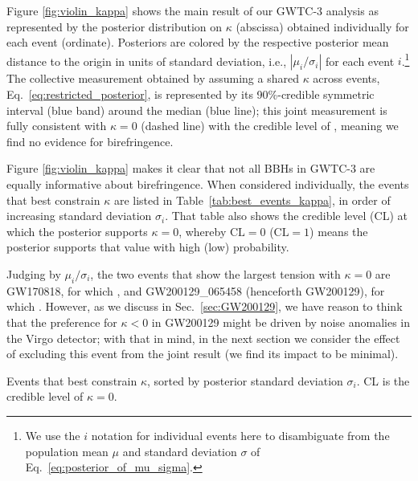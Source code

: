 \documentclass[aps,prd,twocolumn,superscriptaddress,preprintnumbers,nofootinbib]{revtex4-2}
\begin{document}
Figure \ref{fig:violin_kappa} shows the main result of our GWTC-3 analysis as represented by the posterior distribution on $\kappa$ (abscissa) obtained individually for each event (ordinate).
Posteriors are colored by the respective posterior mean distance to the origin in units of standard deviation, i.e., $|\mu_i/\sigma_i|$ for each event $i$.\footnote{We use the $i$ notation for individual events here to disambiguate from the population mean $\mu$ and standard deviation $\sigma$ of Eq.~\eqref{eq:posterior_of_mu_sigma}.}
The collective measurement obtained by assuming a shared $\kappa$ across events, Eq.~\eqref{eq:restricted_posterior}, is represented by its 90\%-credible symmetric interval (blue band) around the median (blue line); this joint measurement is fully consistent with $\kappa = 0$ (dashed line) with the credible level of , meaning we find no evidence for birefringence.

Figure \ref{fig:violin_kappa} makes it clear that not all \acp{BBH} in GWTC-3 are equally informative about birefringence.
When considered individually, the events that best constrain $\kappa$ are listed in Table~\ref{tab:best_events_kappa}, in order of increasing standard deviation $\sigma_i$.
That table also shows the credible level (CL) at which the posterior supports $\kappa = 0$, whereby $\mathrm{CL} = 0$ ($\mathrm{CL} = 1$) means the posterior supports that value with high (low) probability.

Judging by $\mu_i/\sigma_i$, the two events that show the largest tension with $\kappa = 0$ are GW170818, for which , and GW200129\_065458 (henceforth GW200129), for which .
However, as we discuss in Sec.~\ref{sec:GW200129}, we have reason to think that the preference for $\kappa < 0$ in GW200129 might be driven by noise anomalies in the Virgo detector; with that in mind, in the next section we consider the effect of excluding this event from the joint result (we find its impact to be minimal).

\begin{table}
    \caption{Events that best constrain $\kappa$, sorted by posterior standard deviation $\sigma_i$. CL is the credible level of $\kappa = 0$.}
    \begin{ruledtabular}
    \end{ruledtabular}
    \label{tab:best_events_kappa}
\end{table}
\end{document}
